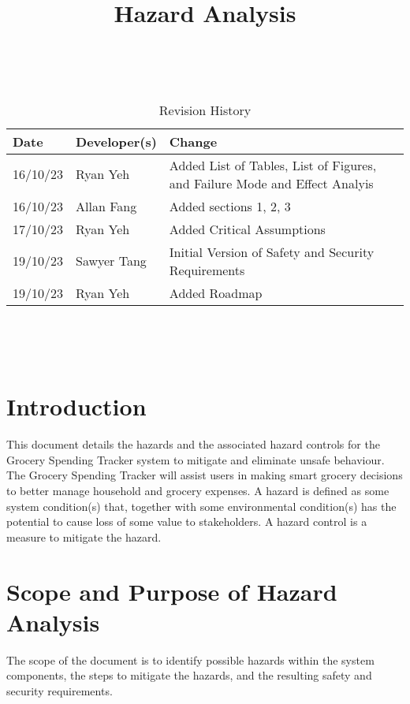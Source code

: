 \documentclass{article}
\title{Hazard Analysis\\\progname}
\author{\authname}
\date{}
\begin{document}
\maketitle
\thispagestyle{empty}

~\newpage


\begin{table}[hp]
\caption{Revision History} \label{TblRevisionHistory}
\begin{tabularx}{\textwidth}{llX}
\toprule
\textbf{Date} & \textbf{Developer(s)} & \textbf{Change}\\
\midrule
16/10/23 & Ryan Yeh & Added List of Tables, List of Figures, and Failure Mode and Effect Analyis\\
16/10/23 & Allan Fang & Added sections 1, 2, 3\\
17/10/23 & Ryan Yeh & Added Critical Assumptions\\
19/10/23 & Sawyer Tang & Initial Version of Safety and Security Requirements\\
19/10/23 & Ryan Yeh & Added Roadmap\\
\bottomrule
\end{tabularx}
\end{table}

~\newpage

\tableofcontents

~\newpage

\listoftables

\listoffigures

\newpage


\section{Introduction}
This document details the hazards and the associated hazard controls for the Grocery Spending Tracker system to mitigate and eliminate unsafe behaviour. The Grocery Spending Tracker will assist users in making smart grocery decisions to better manage household and grocery expenses.  A hazard is defined as some system condition(s) that, together with some environmental condition(s) has the potential to cause loss of some value to stakeholders. A hazard control is a measure to mitigate the hazard.

\section{Scope and Purpose of Hazard Analysis}
The scope of the document is to identify possible hazards within the system components, the steps to mitigate the hazards, and the resulting safety and security requirements.
\end{document}

